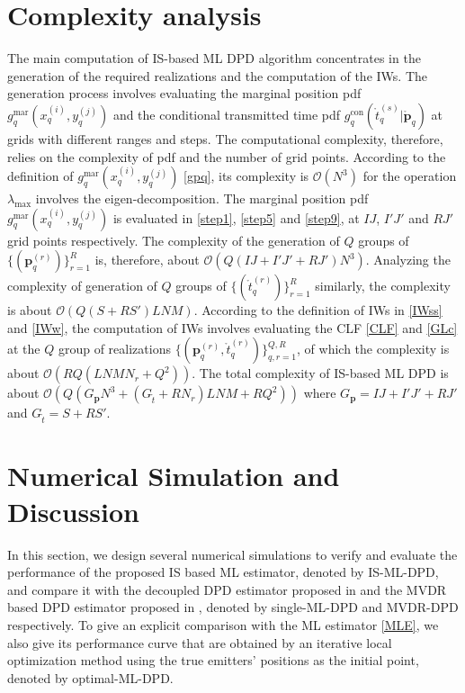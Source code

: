 \documentclass[review]{elsarticle}
\begin{document}
\section{Complexity analysis}
The main computation of IS-based ML DPD algorithm concentrates in the generation of the required realizations and the computation of the IWs. The generation process involves evaluating the marginal position pdf $g_{q}^{\text{mar}}(x_q^{(i)},y_q^{(j)})$ and the conditional transmitted time pdf $g_{q}^{\text{con}}(\mathring{t}_q^{(s)} \vert \mathring{\boldsymbol{p}}_q)$ at grids with different ranges and steps. The computational complexity, therefore, relies on the complexity of pdf and the number of grid points. According to the definition of $g_{q}^{\text{mar}}(x_q^{(i)},y_q^{(j)})$ \eqref{gpq}, its complexity is $\mathcal{O}(N^3)$ for the operation $\lambda_{\text{max}}$ involves the eigen-decomposition. The marginal position pdf $g_{q}^{\text{mar}}(x_q^{(i)},y_q^{(j)})$ is evaluated in \eqref{step1}, \eqref{step5} and \eqref{step9}, at  $IJ$, $I'J'$ and $RJ'$ grid points respectively. The complexity of the generation of $Q$ groups of $\lbrace(\boldsymbol{p}_q^{(r)})\rbrace_{r=1}^{R}$ is, therefore, about $\mathcal{O}(Q(IJ+I'J'+RJ')N^3)$. Analyzing the complexity of generation of $Q$ groups of $\lbrace(\mathring{t}_q^{(r)})\rbrace_{r=1}^{R}$ similarly, the complexity is about $\mathcal{O}(Q(S+RS')LNM)$. According to the definition of IWs in \eqref{IWss} and \eqref{IWw}, the computation of IWs involves evaluating the CLF \eqref{CLF} and \eqref{GLc} at the $Q$ group of realizations $\lbrace(\boldsymbol{p}_q^{(r)},\mathring{t}_q^{(r)})\rbrace_{q,r=1}^{Q,R}$, of which the complexity is about $\mathcal{O}(RQ(LNMN_r+Q^2))$. The total complexity of IS-based ML DPD is about $\mathcal{O}(Q(G_{\boldsymbol{p}}N^3+(G_{\mathring{t}}+RN_r)LNM+RQ^2))$ where $G_{\boldsymbol{p}}=IJ+I'J'+RJ'$ and $G_{\mathring{t}}=S+RS'$.

\section{Numerical Simulation and Discussion}
In this section, we design several numerical simulations to verify and evaluate the performance of the proposed IS based ML estimator, denoted by IS-ML-DPD, and compare it with the decoupled DPD estimator proposed in \cite{DPD2005} and the MVDR based DPD estimator proposed in \cite{Tirer2015High}, denoted by single-ML-DPD and MVDR-DPD respectively. To give an explicit comparison with the ML estimator \eqref{MLE}, we also give its performance curve that are obtained by an iterative local optimization method using the true emitters' positions as the initial point, denoted by optimal-ML-DPD.
\end{document}
